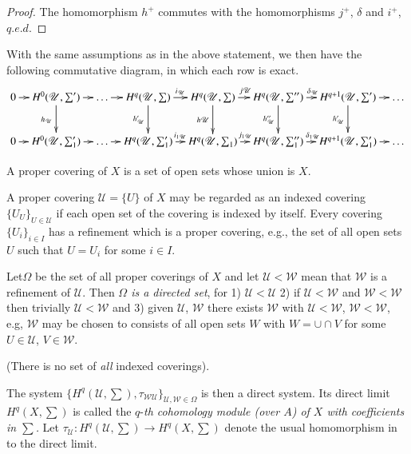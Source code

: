 \begin{proof}
The homomorphism $h^+$ commutes with the homomorphisms $j^+$, $\delta$
and $i^+$, $q. e. d$. 
\end{proof}

With the same assumptions as in the above statement, we then have the
following commutative diagram, in which each row is exact. 
{\fontsize{7}{10}\selectfont
\[
\xymatrix@C=0.3cm{
0\ar[r]& H^0(\mathscr{U}, \sum') \ar[r]\ar[d]_{h_{\mathscr{U}}} &
\ldots \ar[r]& H^q(\mathscr{U}, \sum)\ar[r]^{i_{\mathscr{U}}}
\ar[d]_{h'_{\mathscr{U}}} & H^q(\mathscr{U},
\sum)\ar[r]^{j\mathscr{U}}\ar[d]_{h\mathscr{U}} & H^q (\mathscr{U},
\sum'') \ar[r]^{\delta_{\mathscr{U}}} \ar[d]_{h''_{\mathscr{U}}} &
H^{q+1}(\mathscr{U}, \sum') \ar[d]_{h'_{\mathscr{U}}} \ar[r] & \ldots\\
0 \ar[r]& H^0(\mathscr{U},\sum'_1) \ar[r] & \ldots \ar[r] &
H^q(\mathscr{U},\sum'_1)  \ar[r]^{i_{1\mathscr{U}}} & H^q(\mathscr{U},
\sum_1) \ar[r]^{j_{1\mathscr{U}}} & H^q (\mathscr{U}, \sum''_1)
\ar[r]^{\delta_{1\mathscr{U}}} & H^{q+1}(\mathscr{U},\sum'_1) \ar[r]& \ldots
}
\]}\relax

\begin{defi*}%
A proper covering of $X$ is a set of open sets whose union is $X$. 
\end{defi*}

A proper covering $\mathscr{U} =\{ U\}$ of $X$ may be regarded as an
indexed covering $\big\{U_U \big\}_{U \in \mathscr{U}}$ if each open
set of the covering is indexed by itself. Every covering $ \big\{U_i
\big\}_{i \in I}$ has a refinement which is a proper covering, e.g.,
the set of all open sets $U$ such that $U = U_i$ for some $i \in I$.  

Let\pageoriginale $\Omega$ be the set of  all proper coverings of $X$ and let
$\mathscr{U} < \mathscr{W}$ mean that $\mathscr{W}$ is a refinement of
$\mathscr{U}$. Then \textit{$\Omega$ is a directed set}, for 1)
$\mathscr{U}< \mathscr{U}$ 
2)  if $\mathscr{U} < \mathscr{W}$ and $\mathscr{W}<
\mathscr{W}$ then trivially $\mathscr{U} < \mathscr{W}$ and 3) given
$\mathscr{U}$, $\mathscr{W}$ there exists $\mathscr{W}$ with 
$\mathscr{U} < \mathscr{W}$, $\mathscr{W}<\mathscr{W}$, e.g,
$\mathscr{W}$ may be chosen to consists of all open sets $W$ with
$W=\cup \cap V$ for some $U \in \mathscr{U}$, $V \in \mathscr{W}$. 

(There is no set of \textit{all} indexed coverings). 

The system $\big\{ H^q (\mathscr{U},\sum), \tau _{\mathscr{W}\mathscr{U}}
\big\}_{\mathscr{U},\mathscr{W} \in \Omega}$ is then a direct system. Its
direct limit $H^q(X,\sum)$ is called the $q$-\textit{th cohomology
  module (over $A$) of $X$ with coefficients in $\sum$.} Let
$\tau_\mathscr{U}:H^q(\mathscr{U},\sum) \to H^q(X ,\sum)$ denote the
usual homomorphism in to the direct limit. 

